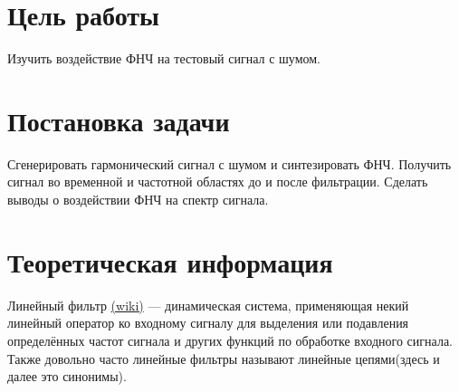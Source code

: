 







\section{Цель работы}
Изучить воздействие ФНЧ  на тестовый сигнал с шумом.

\section{Постановка задачи}
Сгенерировать гармонический сигнал с шумом
и синтезировать ФНЧ. Получить сигнал во временной и частотной
областях до и после фильтрации. Сделать выводы о воздействии
ФНЧ на спектр сигнала.

\section{Теоретическая информация}
Линейный фильтр
\href{https://ru.wikipedia.org/wiki/%D0%9B%D0%B8%D0%BD%D0%B5%D0%B9%D0%BD%D1%8B%D0%B9_%D1%84%D0%B8%D0%BB%D1%8C%D1%82%D1%80}{(wiki)}
 — динамическая система, применяющая некий линейный оператор ко входному сигналу для выделения или 
подавления определённых частот сигнала и других функций по обработке входного сигнала.
Также довольно часто линейные фильтры называют линейные цепями(здесь и далее это синонимы).

